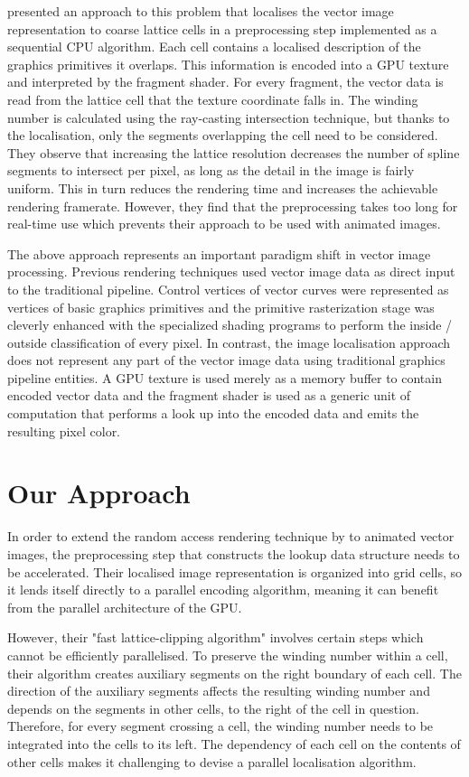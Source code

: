\documentclass[11pt,a4paper,twoside]{article}
\begin{document}
\cite{NehabHoppe08} presented an approach to this problem that localises the vector image representation to coarse lattice cells in a preprocessing step implemented as a sequential CPU algorithm. Each cell contains a localised description of the graphics primitives it overlaps. This information is encoded into a GPU texture and interpreted by the fragment shader. For every fragment, the vector data is read from the lattice cell that the texture coordinate falls in. The winding number is calculated using the ray-casting intersection technique, but thanks to the localisation, only the segments overlapping the cell need to be considered. They observe that increasing the lattice resolution decreases the number of spline segments to intersect per pixel, as long as the detail in the image is fairly uniform. This in turn reduces the rendering time and increases the achievable rendering framerate. However, they find that the preprocessing takes too long for real-time use which prevents their approach to be used with animated images.

The above approach represents an important paradigm shift in vector image processing. Previous rendering techniques used vector image data as direct input to the traditional pipeline. Control vertices of vector curves were represented as vertices of basic graphics primitives and the primitive rasterization stage was cleverly enhanced with the specialized shading programs to perform the inside / outside classification of every pixel. In contrast, the image localisation approach does not represent any part of the vector image data using traditional graphics pipeline entities. A GPU texture is used merely as a memory buffer to contain encoded vector data and the fragment shader is used as a generic unit of computation that performs a look up into the encoded data and emits the resulting pixel color.

\section {Our Approach}

In order to extend the random access rendering technique by \cite{NehabHoppe08} to animated vector images, the preprocessing step that constructs the lookup data structure needs to be accelerated. Their localised image representation is organized into grid cells, so it lends itself directly to a parallel encoding algorithm, meaning it can benefit from the parallel architecture of the GPU.

However, their "fast lattice-clipping algorithm" involves certain steps which cannot be efficiently parallelised. To preserve the winding number within a cell, their algorithm creates auxiliary segments on the right boundary of each cell. The direction of the auxiliary segments affects the resulting winding number and depends on the segments in other cells, to the right of the cell in question. Therefore, for every segment crossing a cell, the winding number needs to be integrated into the cells to its left. The dependency of each cell on the contents of other cells makes it challenging to devise a parallel localisation algorithm.
\end{document}
